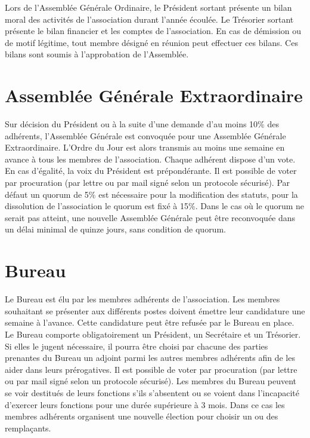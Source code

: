 \documentclass[12pt]{constitution}
\begin{document}
	Lors de l'Assemblée Générale Ordinaire, le Président sortant présente un bilan moral des activités de l'association durant l'année écoulée. Le Trésorier sortant présente le bilan financier et les comptes de l'association. En cas de démission ou de motif légitime, tout membre désigné en réunion peut effectuer ces bilans. Ces bilans sont soumis à l'approbation de l'Assemblée.

	\section{Assemblée Générale Extraordinaire}
	Sur décision du Président ou à la suite d'une demande d'au moins 10\% des adhérents, l'Assemblée Générale est convoquée pour une Assemblée Générale Extraordinaire. L'Ordre du Jour est alors transmis au moins une semaine en avance à tous les membres de l'association. Chaque adhérent dispose d'un vote. En cas d'égalité, la voix du Président est prépondérante. Il est possible de voter par procuration (par lettre ou par mail signé selon un protocole sécurisé). Par défaut un quorum de 5\% est nécessaire pour la modification des statuts, pour la dissolution de l'association le quorum est fixé à 15\%. Dans le cas où le quorum ne serait pas atteint, une nouvelle Assemblée Générale peut être reconvoquée dans un délai minimal de quinze jours, sans condition de quorum.

	\section{Bureau}
	Le Bureau est élu par les membres adhérents de l'association. Les membres souhaitant se présenter aux différents postes doivent émettre leur candidature une semaine à l'avance. Cette candidature peut être refusée par le Bureau en place. Le Bureau comporte obligatoirement un Président, un Secrétaire et un Trésorier. Si elles le jugent nécessaire, il pourra être choisi par chacune des parties prenantes du Bureau un adjoint parmi les autres membres adhérents afin de les aider dans leurs prérogatives. Il est possible de voter par procuration (par lettre ou par mail signé selon un protocole sécurisé). Les membres du Bureau peuvent se voir destitués de leurs fonctions s'ils s'absentent ou se voient dans l'incapacité d'exercer leurs fonctions pour une durée supérieure à 3 mois. Dans ce cas les membres adhérents organisent une nouvelle élection pour choisir un ou des remplaçants.\\
\end{document}
